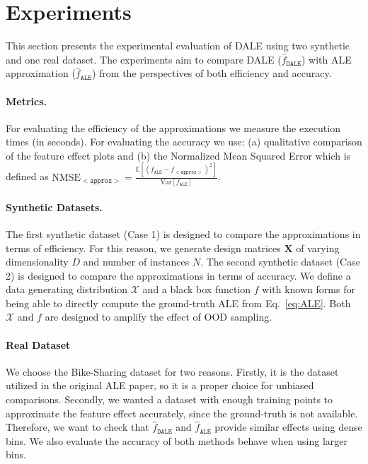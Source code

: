 \documentclass[wcp]{jmlr}
\newcommand{\dale}{\hat{f}_{\mathtt{DALE}}}
\newcommand{\ale}{f_{\mathtt{ALE}}}
\newcommand{\E}{\mathbb{E}} \newcommand{\Jac}{\mathbf{J}}
\begin{document}
% 

\section{Experiments}

This section presents the experimental evaluation of DALE using two
synthetic and one real dataset. The experiments aim to compare DALE
(\(\dale\)) with ALE approximation
(\(\hat{f}_{\mathtt{ALE}}\)) from the perspectives of both efficiency
and accuracy.

\paragraph{Metrics.} For evaluating the efficiency of the
approximations we measure the execution times (in seconds). For
evaluating the accuracy we use: (a) qualitative comparison of the
feature effect plots and (b) the Normalized Mean Squared Error which
is defined as
\(\text{NMSE}_{\mathtt{<approx>}} = \frac{\E[(\ale -
  f_{\mathtt{<approx>}})^2]}{\text{Var}[\ale]}\).

\paragraph{Synthetic Datasets.} The first synthetic dataset (Case 1) is designed
to compare the approximations in terms of efficiency. For this reason,
we generate design matrices \(\mathbf{X}\) of varying dimensionality
\(D\) and number of instances \(N\). The second synthetic dataset
(Case 2) is designed to compare the approximations in terms of
accuracy. We define a data generating distribution \(\mathcal{X}\) and
a black box function \(f\) with known forms for being able to directly
compute the ground-truth ALE from Eq.~\eqref{eq:ALE}. Both
\(\mathcal{X}\) and \(f\) are designed to amplify the effect of OOD
sampling.

\paragraph{Real Dataset} We choose the Bike-Sharing dataset for two
reasons. Firstly, it is the dataset utilized in the original ALE
paper, so it is a proper choice for unbiased comparisons. Secondly, we
wanted a dataset with enough training points to approximate the
feature effect accurately, since the ground-truth is not
available. Therefore, we want to check that \(\dale\) and
\(\hat{f}_{\mathtt{ALE}}\) provide similar effects using dense
bins. We also evaluate the accuracy of both methods behave when using
larger bins.
\end{document}
